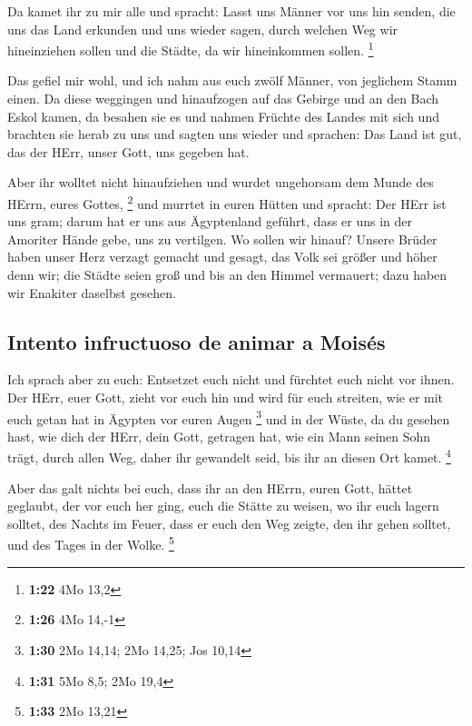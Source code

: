  Da kamet ihr zu mir alle und spracht: Lasst uns Männer
vor uns hin senden, die uns das Land erkunden und uns wieder sagen,
durch welchen Weg wir hineinziehen sollen und die Städte, da wir
hineinkommen sollen. \footnote{\textbf{1:22} 4Mo 13,2}

 Das gefiel mir wohl, und ich nahm aus euch zwölf Männer,
von jeglichem Stamm einen.  Da diese weggingen und
hinaufzogen auf das Gebirge und an den Bach Eskol kamen, da besahen sie
es  und nahmen Früchte des Landes mit sich und brachten
sie herab zu uns und sagten uns wieder und sprachen: Das Land ist gut,
das der HErr, unser Gott, uns gegeben hat.

 Aber ihr wolltet nicht hinaufziehen und wurdet
ungehorsam dem Munde des HErrn, eures Gottes, \footnote{\textbf{1:26}
  4Mo 14,-1}  und murrtet in euren Hütten und spracht:
Der HErr ist uns gram; darum hat er uns aus Ägyptenland geführt, dass er
uns in der Amoriter Hände gebe, uns zu vertilgen.  Wo
sollen wir hinauf? Unsere Brüder haben unser Herz verzagt gemacht und
gesagt, das Volk sei größer und höher denn wir; die Städte seien groß
und bis an den Himmel vermauert; dazu haben wir Enakiter daselbst
gesehen.

\hypertarget{intento-infructuoso-de-animar-a-moisuxe9s}{%
\subsection{Intento infructuoso de animar a
Moisés}\label{intento-infructuoso-de-animar-a-moisuxe9s}}

 Ich sprach aber zu euch: Entsetzet euch nicht und
fürchtet euch nicht vor ihnen.  Der HErr, euer Gott,
zieht vor euch hin und wird für euch streiten, wie er mit euch getan hat
in Ägypten vor euren Augen \footnote{\textbf{1:30} 2Mo 14,14; 2Mo 14,25;
  Jos 10,14}  und in der Wüste, da du gesehen hast, wie
dich der HErr, dein Gott, getragen hat, wie ein Mann seinen Sohn trägt,
durch allen Weg, daher ihr gewandelt seid, bis ihr an diesen Ort kamet.
\footnote{\textbf{1:31} 5Mo 8,5; 2Mo 19,4}

 Aber das galt nichts bei euch, dass ihr an den HErrn,
euren Gott, hättet geglaubt,  der vor euch her ging, euch
die Stätte zu weisen, wo ihr euch lagern solltet, des Nachts im Feuer,
dass er euch den Weg zeigte, den ihr gehen solltet, und des Tages in der
Wolke. \footnote{\textbf{1:33} 2Mo 13,21}

